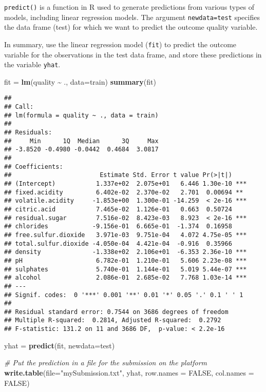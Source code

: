\documentclass[
]{article}
\newenvironment{Shaded}{\begin{snugshade}}{\end{snugshade}}
\newcommand{\AttributeTok}[1]{\textcolor[rgb]{0.13,0.29,0.53}{#1}}
\newcommand{\CommentTok}[1]{\textcolor[rgb]{0.56,0.35,0.01}{\textit{#1}}}
\newcommand{\ConstantTok}[1]{\textcolor[rgb]{0.56,0.35,0.01}{#1}}
\newcommand{\FunctionTok}[1]{\textcolor[rgb]{0.13,0.29,0.53}{\textbf{#1}}}
\newcommand{\NormalTok}[1]{#1}
\newcommand{\OtherTok}[1]{\textcolor[rgb]{0.56,0.35,0.01}{#1}}
\newcommand{\SpecialCharTok}[1]{\textcolor[rgb]{0.81,0.36,0.00}{\textbf{#1}}}
\newcommand{\StringTok}[1]{\textcolor[rgb]{0.31,0.60,0.02}{#1}}
\begin{document}
\texttt{predict()} is a function in R used to generate predictions from
various types of models, including linear regression models. The
argument \texttt{newdata=test} specifies the data frame (test) for which
we want to predict the outcome quality variable.

In summary, use the linear regression model (\texttt{fit}) to predict
the outcome variable for the observations in the test data frame, and
store these predictions in the variable \texttt{yhat}.

\begin{Shaded}
\begin{Highlighting}[]
\NormalTok{fit }\OtherTok{=} \FunctionTok{lm}\NormalTok{(quality }\SpecialCharTok{\textasciitilde{}}\NormalTok{ ., }\AttributeTok{data=}\NormalTok{train)}
\FunctionTok{summary}\NormalTok{(fit)}
\end{Highlighting}
\end{Shaded}

\begin{verbatim}
## 
## Call:
## lm(formula = quality ~ ., data = train)
## 
## Residuals:
##     Min      1Q  Median      3Q     Max 
## -3.8520 -0.4980 -0.0442  0.4684  3.0817 
## 
## Coefficients:
##                        Estimate Std. Error t value Pr(>|t|)    
## (Intercept)           1.337e+02  2.075e+01   6.446 1.30e-10 ***
## fixed.acidity         6.402e-02  2.370e-02   2.701  0.00694 ** 
## volatile.acidity     -1.853e+00  1.300e-01 -14.259  < 2e-16 ***
## citric.acid           7.465e-02  1.126e-01   0.663  0.50724    
## residual.sugar        7.516e-02  8.423e-03   8.923  < 2e-16 ***
## chlorides            -9.156e-01  6.665e-01  -1.374  0.16958    
## free.sulfur.dioxide   3.971e-03  9.751e-04   4.072 4.75e-05 ***
## total.sulfur.dioxide -4.050e-04  4.421e-04  -0.916  0.35966    
## density              -1.338e+02  2.106e+01  -6.353 2.36e-10 ***
## pH                    6.782e-01  1.210e-01   5.606 2.23e-08 ***
## sulphates             5.740e-01  1.144e-01   5.019 5.44e-07 ***
## alcohol               2.086e-01  2.685e-02   7.768 1.03e-14 ***
## ---
## Signif. codes:  0 '***' 0.001 '**' 0.01 '*' 0.05 '.' 0.1 ' ' 1
## 
## Residual standard error: 0.7544 on 3686 degrees of freedom
## Multiple R-squared:  0.2814, Adjusted R-squared:  0.2792 
## F-statistic: 131.2 on 11 and 3686 DF,  p-value: < 2.2e-16
\end{verbatim}

\begin{Shaded}
\begin{Highlighting}[]
\NormalTok{yhat }\OtherTok{=} \FunctionTok{predict}\NormalTok{(fit, }\AttributeTok{newdata=}\NormalTok{test)}

\CommentTok{\# Put the prediction in a file for the submission on the platform}
\FunctionTok{write.table}\NormalTok{(}\AttributeTok{file=}\StringTok{"mySubmission.txt"}\NormalTok{, yhat, }\AttributeTok{row.names =} \ConstantTok{FALSE}\NormalTok{, }\AttributeTok{col.names =} \ConstantTok{FALSE}\NormalTok{)}
\end{Highlighting}
\end{Shaded}
\end{document}
